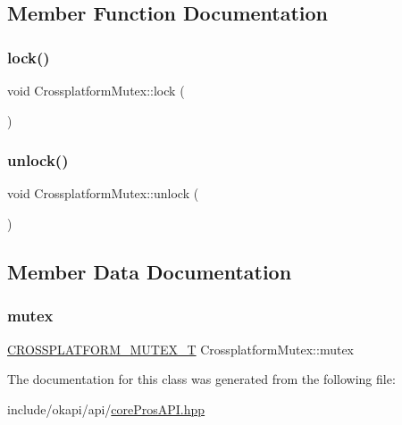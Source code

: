 \subsection{Member Function Documentation}
\mbox{\label{classCrossplatformMutex_a2635624ac3a8b54763943ce380cbc6bd}} 
\subsubsection{\texorpdfstring{lock()}{lock()}}
{\footnotesize\ttfamily void Crossplatform\+Mutex\+::lock (\begin{DoxyParamCaption}{ }\end{DoxyParamCaption})\hspace{0.3cm}{\ttfamily [inline]}}

\mbox{\label{classCrossplatformMutex_a511077dffa768ad86587eed07a1e51e0}} 
\subsubsection{\texorpdfstring{unlock()}{unlock()}}
{\footnotesize\ttfamily void Crossplatform\+Mutex\+::unlock (\begin{DoxyParamCaption}{ }\end{DoxyParamCaption})\hspace{0.3cm}{\ttfamily [inline]}}



\subsection{Member Data Documentation}
\mbox{\label{classCrossplatformMutex_ab89a271155254b137ca809dd62081ab4}} 
\subsubsection{\texorpdfstring{mutex}{mutex}}
{\footnotesize\ttfamily \mbox{\hyperlink{coreProsAPI_8hpp_a2d31e6e2814843325d883d86f93e8663}{C\+R\+O\+S\+S\+P\+L\+A\+T\+F\+O\+R\+M\+\_\+\+M\+U\+T\+E\+X\+\_\+T}} Crossplatform\+Mutex\+::mutex\hspace{0.3cm}{\ttfamily [protected]}}



The documentation for this class was generated from the following file\+:\begin{DoxyCompactItemize}
\item 
include/okapi/api/\mbox{\hyperlink{coreProsAPI_8hpp}{core\+Pros\+A\+P\+I.\+hpp}}\end{DoxyCompactItemize}

